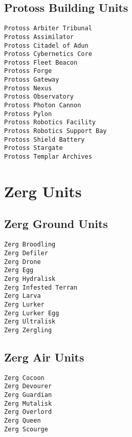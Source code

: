 \subsection{Protoss Building Units}
\verb|Protoss Arbiter Tribunal| \\
\verb|Protoss Assimilator| \\
\verb|Protoss Citadel of Adun| \\
\verb|Protoss Cybernetics Core| \\
\verb|Protoss Fleet Beacon| \\
\verb|Protoss Forge| \\
\verb|Protoss Gateway| \\
\verb|Protoss Nexus| \\
\verb|Protoss Observatory| \\
\verb|Protoss Photon Cannon| \\
\verb|Protoss Pylon| \\
\verb|Protoss Robotics Facility| \\
\verb|Protoss Robotics Support Bay| \\
\verb|Protoss Shield Battery| \\
\verb|Protoss Stargate| \\
\verb|Protoss Templar Archives|

\section{Zerg Units}

\subsection{Zerg Ground Units}
\verb|Zerg Broodling| \\
\verb|Zerg Defiler| \\
\verb|Zerg Drone| \\
\verb|Zerg Egg| \\
\verb|Zerg Hydralisk| \\
\verb|Zerg Infested Terran| \\
\verb|Zerg Larva| \\
\verb|Zerg Lurker| \\
\verb|Zerg Lurker Egg| \\
\verb|Zerg Ultralisk| \\
\verb|Zerg Zergling|

\subsection{Zerg Air Units}
\verb|Zerg Cocoon| \\
\verb|Zerg Devourer| \\
\verb|Zerg Guardian| \\
\verb|Zerg Mutalisk| \\
\verb|Zerg Overlord| \\
\verb|Zerg Queen| \\
\verb|Zerg Scourge|

